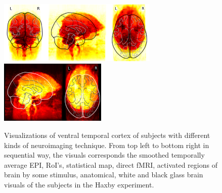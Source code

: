 \documentclass[10pt, twocolumn, letterpaper]{article}
\begin{document}
\begin{figure}
    \includegraphics[width=.50\linewidth, height=3cm,  valign=c]{images/glass_brain_white.png}
    \includegraphics[width=.50\linewidth, height=3cm,  valign=c]{images/glass_brain_black.png}
    \\[\smallskipamount]
    \caption{Visualizations of ventral temporal cortex of subjects with different kinds of neuroimaging technique. From top left to bottom right in sequential way, the visuals corresponds the smoothed temporally average EPI, RoI's, statistical map, direct fMRI, activated regions of brain by some stimulus, anatomical, white and black glass brain visuals of the subjects in the Haxby experiment.}\label{fig:neuroimag}
\end{figure}



\end{document}
